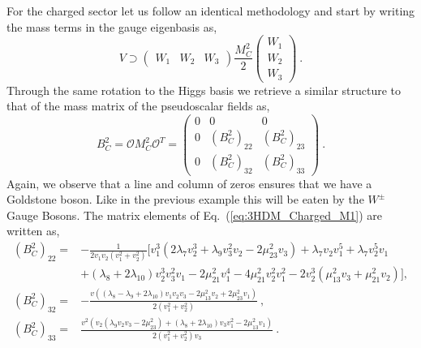 \documentclass[10pt]{report}
\begin{document}
For the charged sector let us  follow an identical methodology and start by writing the mass terms in the gauge eigenbasis as,
%
\begin{equation}
V \supset \left( \begin{array}{ccc} 
W_1 & W_2 & W_3 
\end{array} \right) 
\frac{M_C^2}{2} \left( \begin{array}{c}
W_1 \\ 
W_2 \\
W_3
\end{array} \right) \ .
\end{equation}
Through the same rotation to the Higgs basis we retrieve a similar structure to that of the mass matrix of the pseudoscalar fields as,  
%
\begin{equation}
\label{eq:3HDM_Charged_M1}
B^2_C = \mathcal{O} M_C^2 \mathcal{O}^T = \left( \begin{array}{ccc}
0 & 0 & 0 \\ 
0 & \left( B^2_C \right)_{22} &  \left( B^2_C \right)_{23} \\
0 & \left( B^2_C \right)_{32} &  \left( B^2_C \right)_{33}
\end{array} \right) \ .
\end{equation}
%
Again, we observe that a line and column of zeros ensures that we have a Goldstone boson. Like in the previous example this will be eaten by the $W^\pm$ Gauge Bosons. 
%
The matrix elements of Eq.~(\ref{eq:3HDM_Charged_M1}) are written as,
%
\begin{equation}
\begin{split}
\left( B^2_C \right)_{22} = & -\frac{1}{2 v_1 v_2 \left(v_1^2+v_2^2\right)} \Bigg[ v_1^3 \left(2 \lambda _7 v_2^3+\lambda _9 v_3^2 v_2-2 \mu _{23}^2 v_3\right)+\lambda _7 v_2 v_1^5+\lambda _7 v_2^5 v_1 \\ & +\left(\lambda _8+2 \lambda _{10}\right) v_2^3 v_3^2 v_1-2 \mu _{21}^2 v_1^4-4 \mu _{21}^2 v_2^2 v_1^2-2 v_2^3 \left(\mu _{13}^2 v_3+\mu _{21}^2 v_2\right) \Bigg] ,  
%
\\
%
\left( B^2_C \right)_{32}  = &  -\frac{v \left(\left(\lambda _8-\lambda _9+2 \lambda _{10}\right) v_1 v_2 v_3-2 \mu _{13}^2 v_2+2 \mu _{23}^2 v_1\right)}{2 \left(v_1^2+v_2^2\right)} \ ,
%
\\
%
\left( B^2_C \right)_{33}  = & \frac{v^2 \left(v_2 \left(\lambda _9 v_2 v_3-2 \mu _{23}^2\right)+\left(\lambda _8+2 \lambda _{10}\right) v_3 v_1^2-2 \mu _{13}^2 v_1\right)}{2 \left(v_1^2+v_2^2\right) v_3} \ . 
%
\end{split} 
\end{equation}
\end{document}
